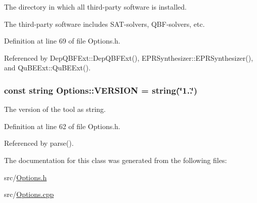 The directory in which all third-\/party software is installed. 

The third-\/party software includes S\-A\-T-\/solvers, Q\-B\-F-\/solvers, etc. 

Definition at line 69 of file Options.\-h.



Referenced by Dep\-Q\-B\-F\-Ext\-::\-Dep\-Q\-B\-F\-Ext(), E\-P\-R\-Synthesizer\-::\-E\-P\-R\-Synthesizer(), and Qu\-B\-E\-Ext\-::\-Qu\-B\-E\-Ext().

\hypertarget{classOptions_ab8a901c1ad7d3ab672db099fb4c0b197}{
\subsubsection[{V\-E\-R\-S\-I\-O\-N}]{\setlength{\rightskip}{0pt plus 5cm}const string Options\-::\-V\-E\-R\-S\-I\-O\-N = string(\char`\"{}1..\char`\"{})\hspace{0.3cm}{\ttfamily [static]}}}\label{classOptions_ab8a901c1ad7d3ab672db099fb4c0b197}


The version of the tool as string. 



Definition at line 62 of file Options.\-h.



Referenced by parse().



The documentation for this class was generated from the following files\-:\begin{DoxyCompactItemize}
\item 
src/\hyperlink{Options_8h}{Options.\-h}\item 
src/\hyperlink{Options_8cpp}{Options.\-cpp}\end{DoxyCompactItemize}
